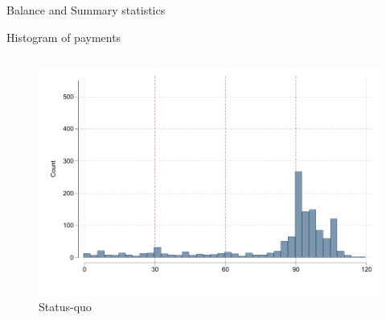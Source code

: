 \documentclass[8pt]{beamer}
\begin{document}
\begin{frame}{Balance and Summary statistics}
    \begin{table}[H]
\caption{Summary statistics and Balance}
\label{SS}
\begin{center}
\resizebox{.65\textwidth}{!}{
\scriptsize{}
}
\end{center}

\end{table}
\end{frame}


\begin{frame}{Histogram of payments}

\begin{columns}
\begin{column}{.33\textwidth}
    \begin{figure}[H]
    \caption{Status-quo}
    \begin{center}
        \includegraphics[width=\textwidth]{Figuras/hist_payments_sq.pdf}
    \end{center}
\end{figure}
\end{column}


\end{columns}
\end{frame}
\end{document}

